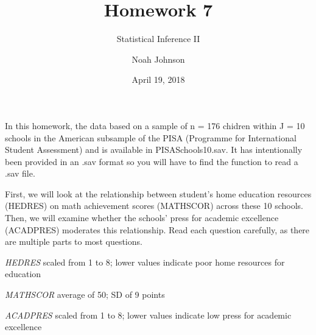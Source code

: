 \documentclass[]{article}
\title{Homework 7}
\subtitle{Statistical Inference II}
\author{Noah Johnson}
\date{April 19, 2018}
\begin{document}
\maketitle

In this homework, the data based on a sample of n = 176 chidren within J
= 10 schools in the American subsample of the PISA (Programme for
International Student Assessment) and is available in PISASchools10.sav.
It has intentionally been provided in an .sav format so you will have to
find the function to read a .sav file.

First, we will look at the relationship between student's home education
resources (HEDRES) on math achievement scores (MATHSCOR) across these 10
schools. Then, we will examine whether the schools' press for academic
excellence (ACADPRES) moderates this relationship. Read each question
carefully, as there are multiple parts to most questions.

\emph{HEDRES} scaled from 1 to 8; lower values indicate poor home
resources for education

\emph{MATHSCOR} average of 50; SD of 9 points

\emph{ACADPRES} scaled from 1 to 8; lower values indicate low press for
academic excellence
\end{document}
